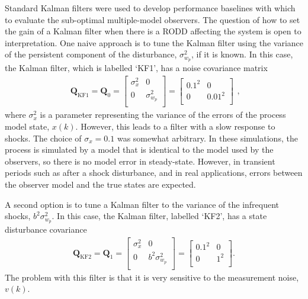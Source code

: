 Standard Kalman filters were used to develop performance baselines with which to evaluate the sub-optimal multiple-model observers. The question of how to set the gain of a Kalman filter when there is a \gls{RODD} affecting the system is open to interpretation. One naive approach is to tune the Kalman filter using the variance of the persistent component of the disturbance, $\sigma_{w_p}^2$, if it is known. In this case, the Kalman filter, which is labelled `KF1', has a noise covariance matrix
%
\begin{equation} \label{eq:sim-sys-siso-KF1-Q}
	\begin{aligned}
		\mathbf{Q}_{\text{KF1}}=\mathbf{Q}_0=\begin{bmatrix}
			\sigma_{x}^2 & 0 \\
			0 &  \sigma_{w_p}^2 \\
		\end{bmatrix}=\begin{bmatrix}
		0.1^2 & 0 \\
		0 & 0.01^2 \\
	\end{bmatrix}
	\end{aligned},
\end{equation}
where $\sigma_{x}^2$ is a parameter representing the variance of the errors of the process model state, $x(k)$. However, this leads to a filter with a slow response to shocks. The choice of $\sigma_{x}=0.1$ was somewhat arbitrary. In these simulations, the process is simulated by a model that is identical to the model used by the observers, so there is no model error in steady-state. However, in transient periods such as after a shock disturbance, and in real applications, errors between the observer model and the true states are expected.

A second option is to tune a Kalman filter to the variance of the infrequent shocks, $b^2\sigma_{w_p}^2$.  In this case, the Kalman filter, labelled `KF2', has a state disturbance covariance
%
\begin{equation} \label{eq:sim-sys-siso-KF2-Q}
	\begin{aligned}
		\mathbf{Q}_{\text{KF2}}=\mathbf{Q}_1=\begin{bmatrix}
			\sigma_{x}^2 & 0 \\
			0 & b^2\sigma_{w_p}^2 \\
		\end{bmatrix}=\begin{bmatrix}
			0.1^2 & 0 \\
			0 & 1^2 \\
		\end{bmatrix}.
	\end{aligned}
\end{equation}
The problem with this filter is that it is very sensitive to the measurement noise, $v(k)$. 

